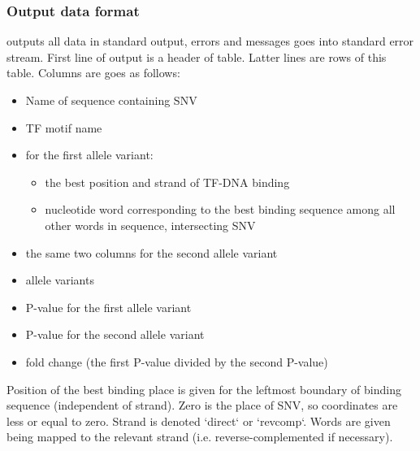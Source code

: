 \example{}

\subsubsection{Output data format}

 outputs all data in standard output, errors and messages goes into standard error stream. First line of output is a header of table. Latter lines are rows of this table. Columns are goes as follows:
\begin{itemize}
\item Name of sequence containing SNV
\item TF motif name
\item for the first allele variant:
\begin{itemize}
\item   the best position and strand of TF-DNA binding
\item   nucleotide word corresponding to the best binding sequence among all other words in sequence, intersecting SNV
\end{itemize}
\item the same two columns for the second allele variant
\item allele variants
\item P-value for the first allele variant
\item P-value for the second allele variant
\item fold change (the first P-value divided by the second P-value)
\end{itemize}

Position of the best binding place is given for the leftmost boundary of binding sequence (independent of strand). Zero is the place of SNV, so coordinates are less or equal to zero. Strand is denoted `direct` or `revcomp`. Words are given being mapped to the relevant strand (i.e. reverse-complemented if necessary).
